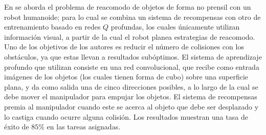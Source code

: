 En \cite{8462863} se aborda el problema de reacomodo de objetos de forma no prensil con un robot humanoide; para lo cual se combina un sistema de recompensas con otro de entrenamiento basado en redes $Q$ profundas, los cuales únicamente utilizan información visual, a partir de la cual el robot planea estrategias de reacomodo.
Uno de los objetivos de los autores es reducir el número de colisiones con los obstáculos, ya que estas llevan a resultados subóptimos.
El sistema de aprendizaje profundo que utilizan consiste en una red convolucional, que recibe como entrada imágenes de los objetos (los cuales tienen forma de cubo) sobre una superficie plana, y da como salida una de cinco direcciones posibles, a lo largo de la cual se debe mover el manipulador para empujar los objetos.
El sistema de recompensas premia al manipulador cuando este se acerca al objeto que debe ser desplazado y lo castiga cuando ocurre alguna colisión.
Los resultados muestran una tasa de éxito de $85\%$ en las tareas asignadas.

